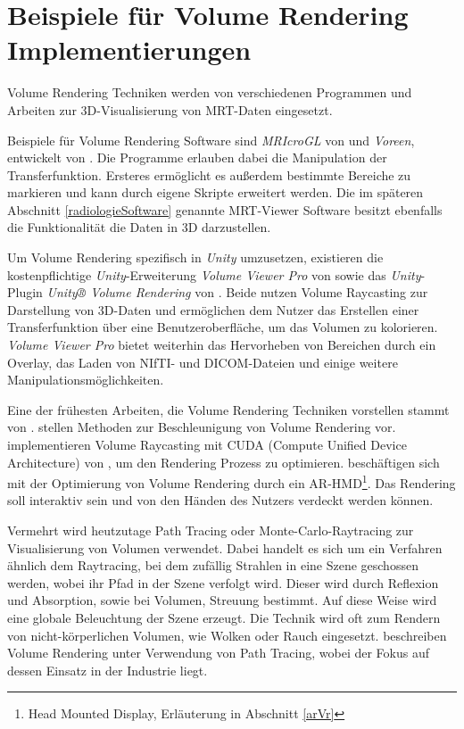\section{Beispiele für Volume Rendering Implementierungen}
\label{volumeRenderingImplementierung}

Volume Rendering Techniken werden von verschiedenen Programmen und Arbeiten zur 3D-Visualisierung von MRT-Daten eingesetzt.

Beispiele für Volume Rendering Software sind \textit{MRIcroGL} von \cite{MRIcroGL} und \textit{Voreen}, entwickelt von \cite{voreen}. Die Programme erlauben dabei die Manipulation der Transferfunktion. Ersteres ermöglicht es außerdem bestimmte Bereiche zu markieren und kann durch eigene Skripte erweitert werden.
Die im späteren Abschnitt \ref{radiologieSoftware} genannte MRT-Viewer Software besitzt ebenfalls die Funktionalität die Daten in 3D darzustellen.

Um Volume Rendering spezifisch in \textit{Unity} umzusetzen, existieren die kostenpflichtige \textit{Unity}-Erweiterung \textit{Volume Viewer Pro} von \cite{volumeViewerPro} sowie das \textit{Unity}-Plugin \textit{Unity® Volume Rendering} von \cite{volumeRenderingUnity}. Beide nutzen Volume Raycasting zur Darstellung von 3D-Daten und ermöglichen dem Nutzer das Erstellen einer Transferfunktion über eine Benutzeroberfläche, um das Volumen zu kolorieren. \textit{Volume Viewer Pro} bietet weiterhin das Hervorheben von Bereichen durch ein Overlay, das Laden von NIfTI- und DICOM-Dateien und einige weitere Manipulationsmöglichkeiten. 

Eine der frühesten Arbeiten, die Volume Rendering Techniken vorstellen stammt von \cite{Drebin88}.
\cite{Kruger03} stellen Methoden zur Beschleunigung von Volume Rendering vor.
\cite{Marsalek08} implementieren Volume Raycasting mit CUDA (Compute Unified Device Architecture) von \cite{cuda}, um den Rendering Prozess zu optimieren.
\cite{Kutter08} beschäftigen sich mit der Optimierung von Volume Rendering durch ein AR-HMD\footnote{Head Mounted Display, Erläuterung in Abschnitt \ref{arVr}}. Das Rendering soll interaktiv sein und von den Händen des Nutzers verdeckt werden können.

Vermehrt wird heutzutage Path Tracing oder Monte-Carlo-Raytracing zur Visualisierung von Volumen verwendet. Dabei handelt es sich um ein Verfahren ähnlich dem Raytracing, bei dem zufällig Strahlen in eine Szene geschossen werden, wobei ihr Pfad in der Szene verfolgt wird. Dieser wird durch Reflexion und Absorption, sowie bei Volumen, Streuung bestimmt. Auf diese Weise wird eine globale Beleuchtung der Szene erzeugt. Die Technik wird oft zum Rendern von nicht-körperlichen Volumen, wie Wolken oder Rauch eingesetzt. 
\cite{Fong17} beschreiben Volume Rendering unter Verwendung von Path Tracing, wobei der Fokus auf dessen Einsatz in der Industrie liegt.

